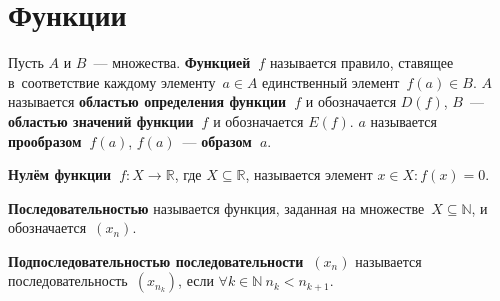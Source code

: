 \section{Функции}
 Пусть $A$ и $B$~--- множества.
\textbf{Функцией~$f$} называется правило, ставящее в~соответствие каждому элементу~$a \in A$ единственный элемент~$f(a) \in B$.
$A$ называется \textbf{областью определения функции~$f$} и обозначается $D(f)$, $B$~--- \textbf{областью значений функции~$f$} и обозначается $E(f)$.
$a$ называется \textbf{прообразом~$f(a)$}, $f(a)$~--- \textbf{образом~$a$}.

\textbf{Нулём функции~$f \colon X \to \mathbb R$}, где $X \subseteq \mathbb R$, называется элемент $x \in X \colon f(x) = 0$.

 \textbf{Последовательностью} называется функция, заданная на множестве~$X \subseteq \mathbb N$, и обозначается~$(x_n)$.

\textbf{Подпоследовательностью последовательности~$(x_n)$} называется последовательность~$(x_{n_k})$, если $\forall k \in \mathbb N \ n_k < n_{k+1}$.